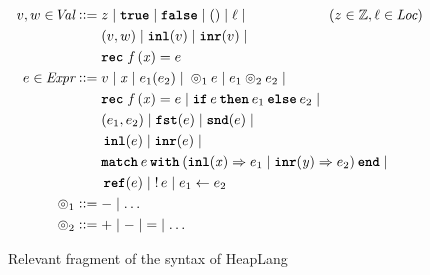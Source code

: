 \documentclass[thesis.tex]{subfiles}
\begin{document}
\begin{figure}[t]
    \begin{center}
        \begin{align*}
            \val,\valB \in \Val \bnfdef{} &
            z \mid
            \True \mid \False \mid
            \TT \mid
            \loc \mid                     \hspace*{2cm} (z \in \integer, \loc \in \Loc) \\ &
            (\val,\valB) \mid
            \Inl(\val) \mid
            \Inr(\val) \mid                                                             \\ &
            \Rec\lvarF\,(\lvar)= \expr                                                  \\
            \expr \in \Expr \bnfdef{}     &
            \val \mid
            \lvar \mid
            \expr_1(\expr_2) \mid
            {}
            \HLOp_1 \expr \mid
            \expr_1 \HLOp_2 \expr_2 \mid                                                \\ &
            \Rec\lvarF\,(\lvar)= \expr \mid
            \If \expr then \expr_1 \Else \expr_2 \mid
            {}                                                                          \\ &
            (\expr_1,\expr_2) \mid
            \Fst(\expr) \mid
            \Snd(\expr) \mid
            {}                                                                          \\ &
            \Inl(\expr) \mid
            \Inr(\expr) \mid                                                            \\ &
            \Match \expr with (\Inl(\lvar) => \expr_1 | \Inr(\lvarB) => \expr_2) end \mid
            {}                                                                          \\ &
            \Alloc(\expr) \mid
            \deref \expr \mid
            \expr_1 \gets \expr_2                                                       \\
            \HLOp_1 \bnfdef{}             & - \mid \ldots                               \\
            \HLOp_2 \bnfdef{}             & + \mid - \mid \mathop{=} \mid \ldots
        \end{align*}
        \caption{Relevant fragment of the syntax of HeapLang}
        \label{fig:heaplangsyntax}
    \end{center}
\end{figure}
\end{document}
